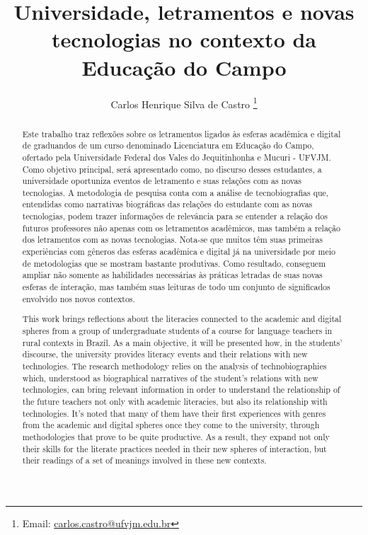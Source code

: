 \documentclass{textolivre}
\title{Universidade, letramentos e novas tecnologias no contexto da Educação do Campo}
\author[1]{Carlos Henrique Silva de Castro \orcid{0000-0001-8593-060X} \thanks{Email: \url{carlos.castro@ufvjm.edu.br}}}
\affil[1]{Universidade Federal dos Vales do Jequitinhonha e Mucuri (UFVJM), Brasil.}
\begin{document}
\maketitle

\begin{polyabstract}
\begin{abstract}
Este trabalho traz reflexões sobre os letramentos ligados às esferas acadêmica e digital de graduandos de um curso denominado Licenciatura em Educação do Campo, ofertado pela Universidade Federal dos Vales do Jequitinhonha e Mucuri - UFVJM. Como objetivo principal, será apresentado como, no discurso desses estudantes, a universidade oportuniza eventos de letramento e suas relações com as novas tecnologias. A metodologia de pesquisa conta com a análise de tecnobiografias que, entendidas como narrativas biográficas das relações do estudante com as novas tecnologias, podem trazer informações de relevância para se entender a relação dos futuros professores não apenas com os letramentos acadêmicos, mas também a relação dos letramentos com as novas tecnologias. Nota-se que muitos têm suas primeiras experiências com gêneros das esferas acadêmica e digital já na universidade por meio de metodologias que se mostram bastante produtivas. Como resultado, conseguem ampliar não somente as habilidades necessárias às práticas letradas de suas novas esferas de interação, mas também suas leituras de todo um conjunto de significados envolvido nos novos contextos.

\end{abstract}

\begin{english}
\begin{abstract}
This work brings reflections about the literacies connected to the academic and digital spheres from a group of undergraduate students of a course for language teachers in rural contexts in Brazil. As a main objective, it will be presented how, in the students' discourse, the university provides literacy events and their relations with new technologies. The research methodology relies on the analysis of technobiographies which, understood as biographical narratives of the student's relations with new technologies, can bring relevant information in order to understand the relationship of the future teachers not only with academic literacies, but also its relationship with technologies. It’s noted that many of them have their first experiences with genres from the academic and digital spheres once they come to the university, through methodologies that prove to be quite productive. As a result, they expand not only their skills for the literate practices needed in their new spheres of interaction, but their readings of a set of meanings involved in these new contexts.


\end{abstract}
\end{english}
\end{polyabstract}
\end{document}
